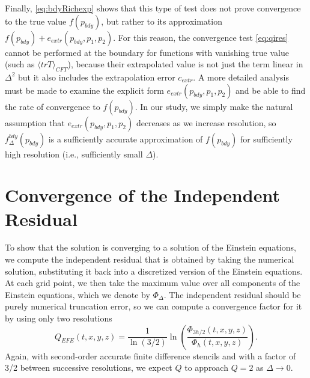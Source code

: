 \documentclass[a4paper,11pt]{article}
\numberwithin{equation}{section}
\begin{document}
Finally, \eqref{eq:bdyRichexp} shows that this type of test does not prove convergence to the true value $f(p_{bdy})$, but rather to its approximation $f(p_{bdy})+e_{extr}(p_{bdy},p_1,p_2)$. For this reason, the convergence test \eqref{eq:qires} cannot be performed at the boundary for functions with vanishing true value (such as $\langle trT \rangle_{CFT}$), because their extrapolated value is not just the term linear in $\Delta^2$ but it also includes the extrapolation error $c_{extr}$. A more detailed analysis must be made to examine the explicit form $e_{extr}(p_{bdy},p_1,p_2)$ and be able to find the rate of convergence to $f(p_{bdy})$. In our study, we simply make the natural assumption that $e_{extr}(p_{bdy},p_1,p_2)$ decreases as we increase resolution, so $f^{bdy}_{\Delta}(p_{bdy})$ is a sufficiently accurate approximation of $f(p_{bdy})$ for sufficiently high resolution (i.e., sufficiently small $\Delta$).


\section{Convergence of the Independent Residual}\label{sec:convbulk}

To show that the solution is converging to a solution of the Einstein equations, we compute the independent residual that is obtained by taking the numerical solution, substituting it back into a discretized version of the Einstein equations.
At each grid point, we then take the maximum value over all components of the Einstein equations, which we denote by $\Phi_\Delta$. 
The independent residual should be purely numerical truncation error, so we can compute a convergence factor for it by using only two resolutions
\begin{equation}\label{eq:qires}
Q_{EFE}(t,x,y,z)=\frac{1}{\ln(3/2)}\ln\left( \frac{\Phi_{3h/2}(t,x,y,z)}{\Phi_{h}(t,x,y,z)} \right).
\end{equation}
Again, with second-order accurate finite difference stencils and with a factor of 3/2 between successive resolutions, we expect $Q$ to approach $Q=2$ as $\Delta\rightarrow0$.
\end{document}
